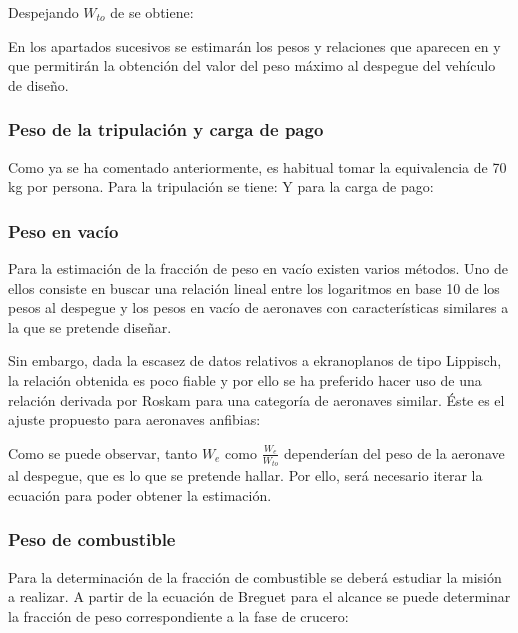 Despejando $W_{to}$ de  se obtiene:

En los apartados sucesivos se estimarán los pesos y relaciones que aparecen en  y que permitirán la obtención del valor del peso máximo al despegue del vehículo de diseño.


\subsubsection{Peso de la tripulación y carga de pago}
\label{sec:design:weights:cpl}

Como ya se ha comentado anteriormente, es habitual tomar la equivalencia de 70 kg por persona. Para la tripulación se tiene:
Y para la carga de pago:


\subsubsection{Peso en vacío}
\label{sec:design:weights:empty}

Para la estimación de la fracción de peso en vacío existen varios métodos. Uno de ellos consiste en buscar una relación lineal entre los logaritmos en base 10 de los pesos al despegue y los pesos en vacío de aeronaves con características similares a la que se pretende diseñar.

Sin embargo, dada la escasez de datos relativos a ekranoplanos de tipo Lippisch, la relación obtenida es poco fiable y por ello se ha preferido hacer uso de una relación derivada por Roskam\cite{ref:roskam} para una categoría de aeronaves similar. Éste es el ajuste propuesto para aeronaves anfibias:

Como se puede observar, tanto $W_e$ como $\frac{W_e}{W_{to}}$ dependerían del peso de la aeronave al despegue, que es lo que se pretende hallar. Por ello, será necesario iterar la ecuación  para poder obtener la estimación.


\subsubsection{Peso de combustible}
\label{sec:design:weights:fuel}

Para la determinación de la fracción de combustible se deberá estudiar la misión a realizar. A partir de la ecuación de Breguet para el alcance se puede determinar la fracción de peso correspondiente a la fase de crucero:


